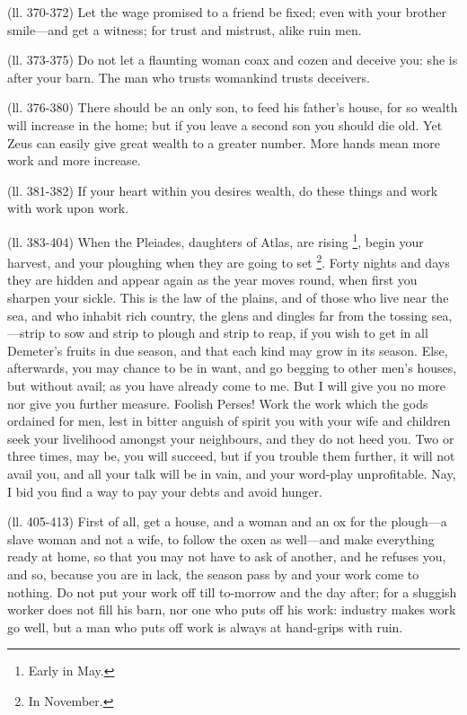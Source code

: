 (ll. 370-372) Let the wage promised to a friend be fixed; even with your
brother smile—and get a witness; for trust and mistrust, alike ruin men.

(ll. 373-375) Do not let a flaunting woman coax and cozen and deceive you: she
is after your barn. The man who trusts womankind trusts deceivers.

(ll. 376-380) There should be an only son, to feed his father’s house,
for so wealth will increase in the home; but if you leave a second son you
should die old. Yet Zeus can easily give great wealth to a greater number. More
hands mean more work and more increase.

(ll. 381-382) If your heart within you desires wealth, do these things and work
with work upon work.

(ll. 383-404) When the Pleiades, daughters of Atlas, are rising \footnote{Early in May.}, begin your harvest, and your
ploughing when they are going to set \footnote{In November.}. Forty
nights and days they are hidden and appear again as the year moves round, when
first you sharpen your sickle. This is the law of the plains, and of those who
live near the sea, and who inhabit rich country, the glens and dingles far from
the tossing sea,—strip to sow and strip to plough and strip to reap, if
you wish to get in all Demeter’s fruits in due season, and that each kind
may grow in its season. Else, afterwards, you may chance to be in want, and go
begging to other men’s houses, but without avail; as you have already
come to me. But I will give you no more nor give you further measure. Foolish
Perses! Work the work which the gods ordained for men, lest in bitter anguish
of spirit you with your wife and children seek your livelihood amongst your
neighbours, and they do not heed you. Two or three times, may be, you will
succeed, but if you trouble them further, it will not avail you, and all your
talk will be in vain, and your word-play unprofitable. Nay, I bid you find a
way to pay your debts and avoid hunger.

(ll. 405-413) First of all, get a house, and a woman and an ox for the
plough—a slave woman and not a wife, to follow the oxen as well—and
make everything ready at home, so that you may not have to ask of another, and
he refuses you, and so, because you are in lack, the season pass by and your
work come to nothing. Do not put your work off till to-morrow and the day
after; for a sluggish worker does not fill his barn, nor one who puts off his
work: industry makes work go well, but a man who puts off work is always at
hand-grips with ruin.

